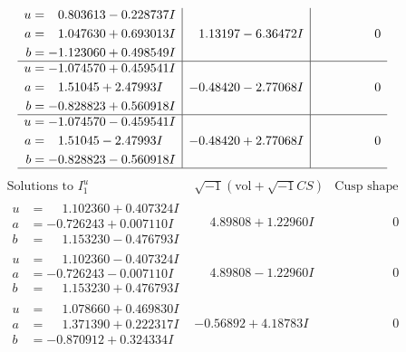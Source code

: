 \documentclass[1p]{elsarticle_modified}
\theoremstyle{definition}
\newcommand{\I}{\sqrt{-1}}
\begin{document}
$$\begin{array}{c|c|c}
\begin{aligned}
u &= \phantom{-}0.803613 - 0.228737 I \\
a &= \phantom{-}1.047630 + 0.693013 I \\
b &= -1.123060 + 0.498549 I\end{aligned}
 & \phantom{-}1.13197 - 6.36472 I & \phantom{-0.000000 } 0 \\ \hline\begin{aligned}
u &= -1.074570 + 0.459541 I \\
a &= \phantom{-}1.51045 + 2.47993 I \\
b &= -0.828823 + 0.560918 I\end{aligned}
 & -0.48420 - 2.77068 I & \phantom{-0.000000 } 0 \\ \hline\begin{aligned}
u &= -1.074570 - 0.459541 I \\
a &= \phantom{-}1.51045 - 2.47993 I \\
b &= -0.828823 - 0.560918 I\end{aligned}
 & -0.48420 + 2.77068 I & \phantom{-0.000000 } 0\\
 \hline 
 \end{array}$$\newpage$$\begin{array}{c|c|c}  
\text{Solutions to }I^u_{1}& \I (\text{vol} + \sqrt{-1}CS) & \text{Cusp shape}\\
 \hline 
\begin{aligned}
u &= \phantom{-}1.102360 + 0.407324 I \\
a &= -0.726243 + 0.007110 I \\
b &= \phantom{-}1.153230 - 0.476793 I\end{aligned}
 & \phantom{-}4.89808 + 1.22960 I & \phantom{-0.000000 } 0 \\ \hline\begin{aligned}
u &= \phantom{-}1.102360 - 0.407324 I \\
a &= -0.726243 - 0.007110 I \\
b &= \phantom{-}1.153230 + 0.476793 I\end{aligned}
 & \phantom{-}4.89808 - 1.22960 I & \phantom{-0.000000 } 0 \\ \hline\begin{aligned}
u &= \phantom{-}1.078660 + 0.469830 I \\
a &= \phantom{-}1.371390 + 0.222317 I \\
b &= -0.870912 + 0.324334 I\end{aligned}
 & -0.56892 + 4.18783 I & \phantom{-0.000000 } 0 \\ \hline\begin{aligned}

\end{aligned}
\end{array}$$
\end{document}
